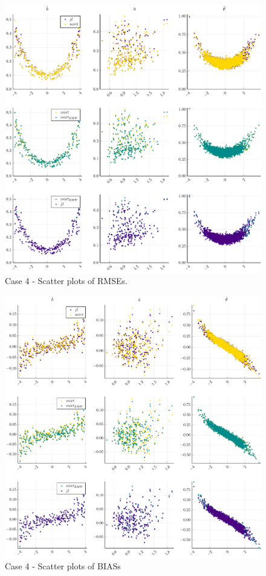\begin{figure}[H] 
	\centering
	\includegraphics[width=\textwidth]{Figures/4/RMSEscatter.pdf}
	\caption{Case 4 - Scatter plots of RMSEs.}
	\label{fig:spRMSE4}
\end{figure}
\begin{figure}[H] 
	\centering
	\includegraphics[width=\textwidth]{Figures/4/BIASscatter.pdf}
	\caption{Case 4 - Scatter plots of BIASs }
	\label{fig:spBIAS4}
\end{figure}

